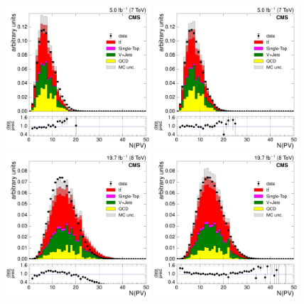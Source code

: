 \begin{figure}[hbtp]
    \centering
      \includegraphics[width=0.48\textwidth]{Chapters/04_Analysis/04b_XSections/images/control_plots/before_fit/7TeV/EPlusJets_nVertex_with_ratio}\hfill
      \includegraphics[width=0.48\textwidth]{Chapters/04_Analysis/04b_XSections/images/control_plots/before_fit/7TeV/EPlusJets_nVertex_reweighted_with_ratio}\\
      \includegraphics[width=0.48\textwidth]{Chapters/04_Analysis/04b_XSections/images/control_plots/before_fit/8TeV/EPlusJets_nVertex_with_ratio}\hfill
      \includegraphics[width=0.48\textwidth]{Chapters/04_Analysis/04b_XSections/images/control_plots/before_fit/8TeV/EPlusJets_nVertex_reweighted_with_ratio}\\

\end{figure}
